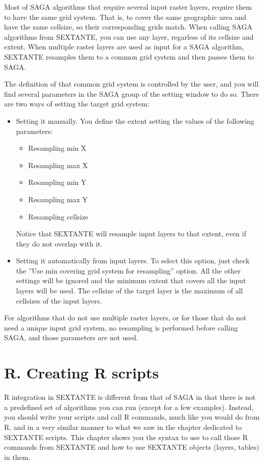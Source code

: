 Most of SAGA algorithms that require several input raster layers, require them to have the same grid system. That is, to cover the same geographic area and have the same cellsize, so their corresponding grids match. When calling SAGA algorithms from SEXTANTE, you can use any layer, regarless of its cellsize and extent. When multiple raster layers are used as input for a SAGA algorithm, SEXTANTE resamples them to a common grid system and then passes them to SAGA.

The definition of that common grid system is controlled by the user, and you will find several parameters in the SAGA group of the setting window to do so. There are two ways of setting the target grid system:

\begin{itemize}
	\item{Setting it manually}. You define the extent setting the values of the following parameters:
	\begin{itemize}
		\item Resampling min X
		\item Resampling max X
		\item Resampling min Y
		\item Resampling max Y
		\item Resampling cellsize
	\end{itemize}
	Notice that SEXTANTE will resample input layers to that extent, even if they do not overlap with it.
	\item Setting it automatically from input layers. To select this option, just check the ''Use min covering grid system for resampling'' option. All the other settings will be ignored and the minimum extent that covers all the input layers will be used. The cellsize of the target layer is the maximum of all cellsizes of the input layers.
\end{itemize}

For algorithms that do not use multiple raster layers, or for those that do not need a unique input grid system, no resampling is performed before calling SAGA, and those parameters are not used.

\section{R. Creating R scripts}\label{rscripts}

R integration in SEXTANTE is different from that of SAGA in that there is not a predefined set of algorithms you can run (except for a few examples). Instead, you should write your scripts and call R commands, much like you would do from R, and in a very similar manner to what we saw in the chapter dedicated to SEXTANTE scripts. This chapter shows you the syntax to use to call those R commands from SEXTANTE and how to use SEXTANTE objects (layers, tables) in them.


